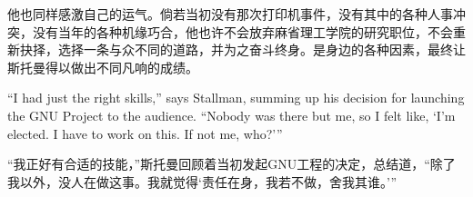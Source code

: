 \ifdefined\chs
他也同样感激自己的运气。倘若当初没有那次打印机事件，没有其中的各种人事冲突，没有当年的各种机缘巧合，他也许不会放弃麻省理工学院的研究职位，不会重新抉择，选择一条与众不同的道路，并为之奋斗终身。是身边的各种因素，最终让斯托曼得以做出不同凡响的成绩。
\fi

\ifdefined\eng
``I had just the right skills,'' says Stallman, summing up his decision for launching the GNU Project to the audience. ``Nobody was there but me, so I felt like, `I'm elected. I have to work on this. If not me, who?'\hspace{0.01in}''
\fi

\ifdefined\chs
``我正好有合适的技能，''斯托曼回顾着当初发起GNU工程的决定，总结道，``除了我以外，没人在做这事。我就觉得`责任在身，我若不做，舍我其谁。'\hspace{0.01in}''
\fi

\theendnotes
\setcounter{endnote}{0}
